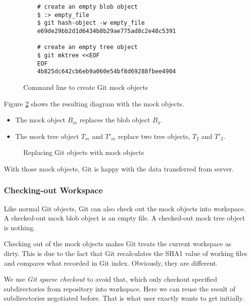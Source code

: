 \documentclass[copyrightwanted=false]{sigplanconf}
\begin{document}
\begin{figure}[htpb]
  \centering
  \begin{verbatim}
    # create an empty blob object
    $ :> empty_file
    $ git hash-object -w empty_file
    e69de29bb2d1d6434b8b29ae775ad8c2e48c5391

    # create an empty tree object
    $ git mktree <<EOF
    EOF
    4b825dc642cb6eb9a060e54bf8d69288fbee4904
  \end{verbatim}
  \caption{Command line to create Git mock objects}
  \label{fig:cmd-create-mock}
\end{figure}

Figure \ref{fig:mock-objects} shows the resulting diagram with the mock
objects.

\begin{itemize}
  \item The mock object $B_m$ replaces the blob object $B_4$.

  \item The mock tree object $T_m$ and $T'_m$ replace two tree objects, $T_2$
    and $T'_2$.
\end{itemize}

\begin{figure}[htpb]
  \centering
  
  \caption{Replacing Git objects with mock objects}
  \label{fig:mock-objects}
\end{figure}

With those mock objects, Git is happy with the data transferred from server.

\subsubsection{Checking-out Workspace}
Like normal Git objects, Git can also check out the mock objects into workspace.
A checked-out mock blob object is an empty file.
A checked-out mock tree object is nothing.

Checking out of the mock objects makes Git treats the current
workspace as dirty.
This is due to the fact that Git recalculates the SHA1 value of working files and compares
what recorded in Git index.
Obviously, they are different.

We use \emph{Git sparse checkout} \cite{sparseco} to avoid that, which only
checkout specified subdirectories from repository into workspace.
Here we can reuse the result of subdirectories negotiated before.
That is what user exactly wants to get initially.
\end{document}
